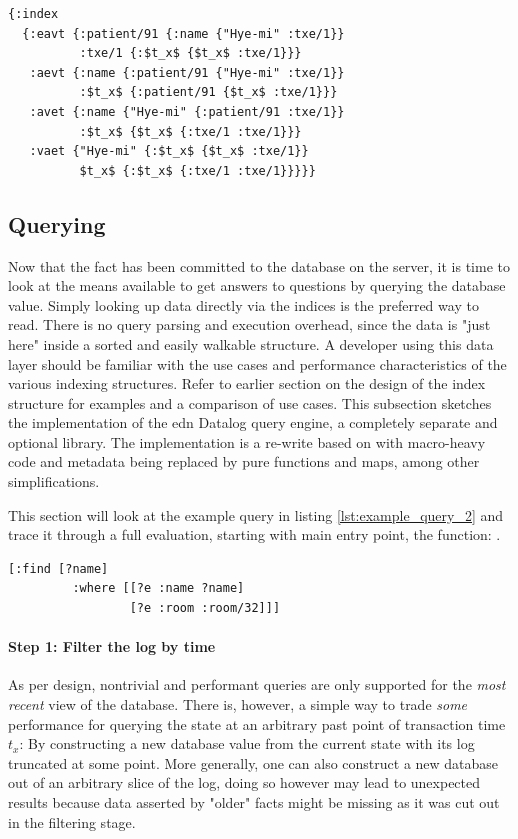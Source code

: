 \begin{lstlisting}[label={lst:indexing_example_result},caption=Fully populated indices after transacting]
{:index
  {:eavt {:patient/91 {:name {"Hye-mi" :txe/1}}
          :txe/1 {:$t_x$ {$t_x$ :txe/1}}}
   :aevt {:name {:patient/91 {"Hye-mi" :txe/1}}
          :$t_x$ {:patient/91 {$t_x$ :txe/1}}}
   :avet {:name {"Hye-mi" {:patient/91 :txe/1}}
          :$t_x$ {$t_x$ {:txe/1 :txe/1}}}
   :vaet {"Hye-mi" {:$t_x$ {$t_x$ :txe/1}}
          $t_x$ {:$t_x$ {:txe/1 :txe/1}}}}}
\end{lstlisting}



\subsection{Querying}

Now that the fact has been committed to the database on the server, it is time to look at the means available to get answers to questions by querying the database value. Simply looking up data directly via the indices is the preferred way to read. There is no query parsing and execution overhead, since the data is "just here" inside a sorted and easily walkable structure. A developer using this data layer should be familiar with the use cases and performance characteristics of the various indexing structures. Refer to earlier section on the design of the index structure for examples and a comparison of use cases. This subsection sketches the implementation of the edn Datalog query engine, a completely separate and optional library. The implementation is a re-write based on \cite{rubin15aosadb} with macro-heavy code and metadata being replaced by pure functions and maps, among other simplifications.

This section will look at the example query in listing \ref{lst:example_query_2} and trace it through a full evaluation, starting with main entry point, the  function: .

\begin{lstlisting}[label={lst:example_query_2},morekeywords={e,name,find,where,room,32},caption="Who's in room no. 32?"]
        [:find [?name]
         :where [[?e :name ?name]
                 [?e :room :room/32]]]
\end{lstlisting}

\paragraph{Step 1: Filter the log by time}
As per design, nontrivial and performant queries are only supported for the \emph{most recent} view of the database. There is, however, a simple way to trade \emph{some} performance for querying the state at an arbitrary past point of transaction time $t_x$: By constructing a new database value from the current state with its log truncated at some point. More generally, one can also construct a new database out of an arbitrary slice of the log, doing so however may lead to unexpected results because data asserted by "older" facts might be missing as it was cut out in the filtering stage.

